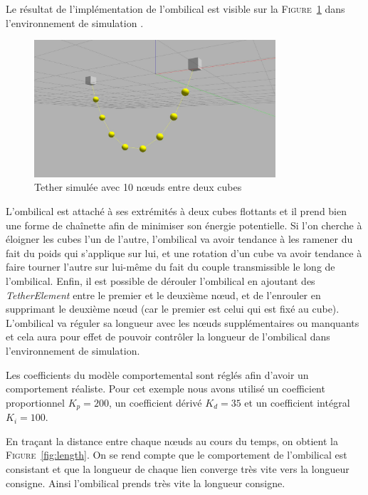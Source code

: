 			Le résultat de l'implémentation de l'ombilical est visible sur la \textsc{Figure}~\ref{fig:tether} dans l'environnement de simulation \gazebo{}.
			
			\begin{figure}[!htb]
				\centering
				\includegraphics[width=0.8\textwidth]{imgs/tether_gazebo.png}
				\caption{Tether simulée avec 10 n\oe uds entre deux cubes}
				\label{fig:tether}
			\end{figure}
			
			L'ombilical est attaché à ses extrémités à deux cubes flottants et il prend bien une forme de chaînette afin de minimiser son énergie potentielle. Si l'on cherche à éloigner les cubes l'un de l'autre, l'ombilical va avoir tendance à les ramener du fait du poids qui s'applique sur lui, et une rotation d'un cube va avoir tendance à faire tourner l'autre sur lui-même du fait du couple transmissible le long de l'ombilical. Enfin, il est possible de dérouler l'ombilical en ajoutant des \textit{TetherElement} entre le premier et le deuxième n\oe ud, et de l'enrouler en supprimant le deuxième n\oe ud (car le premier est celui qui est fixé au cube). L'ombilical va réguler sa longueur avec les n\oe uds supplémentaires ou manquants et cela aura pour effet de pouvoir contrôler la longueur de l'ombilical dans l'environnement de simulation.

			Les coefficients du modèle comportemental sont réglés afin d'avoir un comportement réaliste. Pour cet exemple nous avons utilisé un coefficient proportionnel $K_p = 200$, un coefficient dérivé $K_d = 35$ et un coefficient intégral $K_i = 100$.

			En traçant la distance entre chaque n\oe uds au cours du temps, on obtient la \textsc{Figure}~\ref{fig:length}. On se rend compte que le comportement de l'ombilical est consistant et que la longueur de chaque lien converge très vite vers la longueur consigne. Ainsi l'ombilical prends très vite la longueur consigne. 
			
